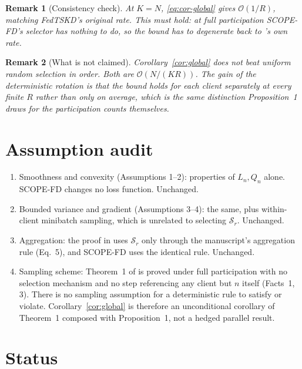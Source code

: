 \documentclass[11pt]{article}
\newtheorem{remark}{Remark}
\begin{document}
\begin{remark}[Consistency check]
\label{rem:consistency}
At $K=N$, \eqref{eq:cor-global} gives $\mathcal{O}(1/R)$, matching FedTSKD's
original rate. This must hold: at full participation SCOPE-FD's selector has
nothing to do, so the bound has to degenerate back to
\cite{mu2024fedtskd}'s own rate.
\end{remark}

\begin{remark}[What is not claimed]
\label{rem:limits}
Corollary~\ref{cor:global} does not beat uniform random selection in order.
Both are $\mathcal{O}(N/(KR))$. The gain of the deterministic rotation is
that the bound holds for each client separately at every finite $R$ rather
than only on average, which is the same distinction Proposition~1 draws for
the participation counts themselves.
\end{remark}

\section{Assumption audit}

\begin{enumerate}[label=(\alph*), leftmargin=2em]
\item Smoothness and convexity (Assumptions 1--2): properties of $L_n,Q_n$
alone. SCOPE-FD changes no loss function. Unchanged.
\item Bounded variance and gradient (Assumptions 3--4): the same, plus
within-client minibatch sampling, which is unrelated to selecting
$\mathcal{S}_r$. Unchanged.
\item Aggregation: the proof in \cite{mu2024fedtskd} uses $\mathcal{S}_r$
only through the manuscript's aggregation rule (Eq.~5), and SCOPE-FD uses the
identical rule. Unchanged.
\item Sampling scheme: Theorem~1 of \cite{mu2024fedtskd} is proved under full
participation with no selection mechanism and no step referencing any client
but $n$ itself (Facts~1, 3). There is no sampling assumption for a
deterministic rule to satisfy or violate. Corollary~\ref{cor:global} is
therefore an unconditional corollary of Theorem~1 composed with
Proposition~1, not a hedged parallel result.
\end{enumerate}

\section{Status}
\end{document}
